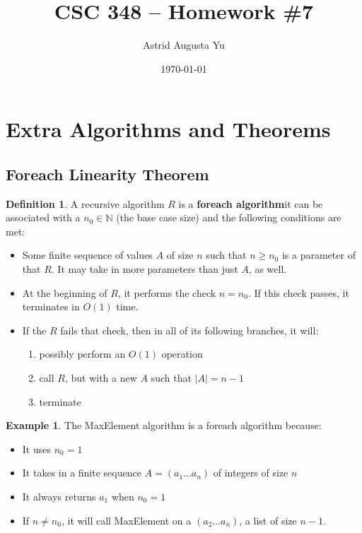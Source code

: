\documentclass{article}
\author{Astrid Augusta Yu}
\title{CSC 348 -- Homework \#7}
\date{\today}
\theoremstyle{definition}
\newtheorem{definition}{Definition}
\newtheorem{example}{Example}[definition]
\begin{document}
\maketitle
\tableofcontents
\newpage

\section{Extra Algorithms and Theorems}

\subsection{Foreach Linearity Theorem}
\begin{definition}
    A recursive algorithm $R$ is a \textbf{foreach algorithm}\footnotemark it can be associated with a $n_0 \in \mathbb{N}$ (the base case size) and the following conditions are met:

    \begin{itemize}
        \item Some finite sequence of values $A$ of size $n$ such that $n \geq n_0$ is a parameter of that $R$. It may take in more parameters than just $A$, as well.
        \item At the beginning of $R$, it performs the check $n = n_0$. If this check passes, it terminates in $O(1)$ time. 
        \item If the $R$ fails that check, then in all of its following branches, it will:
        \begin{enumerate}
            \item possibly perform an $O(1)$ operation
            \item call $R$, but with a new $A$ such that $|A| = n - 1$
            \item terminate
        \end{enumerate}
    \end{itemize}
\end{definition}

\begin{example}
    The MaxElement algorithm is a foreach algorithm because:
    \begin{itemize}
        \item It uses $n_0 = 1$
        \item It takes in a finite sequence $A = (a_1 \dots a_n)$ of integers of size $n$
        \item It always returns $a_1$ when $n_0 = 1$
        \item If $n \neq n_0$, it will call MaxElement on a $(a_2\dots a_n)$, a list of size $n - 1$.
    \end{itemize}
\end{example}
\end{document}
